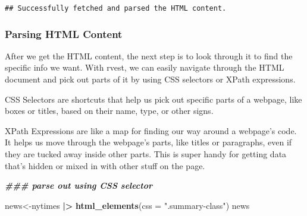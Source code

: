 \documentclass[
]{article}
\newenvironment{Shaded}{\begin{snugshade}}{\end{snugshade}}
\newcommand{\AttributeTok}[1]{\textcolor[rgb]{0.13,0.29,0.53}{#1}}
\newcommand{\DocumentationTok}[1]{\textcolor[rgb]{0.56,0.35,0.01}{\textbf{\textit{#1}}}}
\newcommand{\FunctionTok}[1]{\textcolor[rgb]{0.13,0.29,0.53}{\textbf{#1}}}
\newcommand{\NormalTok}[1]{#1}
\newcommand{\OtherTok}[1]{\textcolor[rgb]{0.56,0.35,0.01}{#1}}
\newcommand{\SpecialCharTok}[1]{\textcolor[rgb]{0.81,0.36,0.00}{\textbf{#1}}}
\newcommand{\StringTok}[1]{\textcolor[rgb]{0.31,0.60,0.02}{#1}}
\begin{document}
\begin{verbatim}
## Successfully fetched and parsed the HTML content.
\end{verbatim}

\hypertarget{parsing-html-content}{%
\subsubsection{Parsing HTML Content}\label{parsing-html-content}}

After we get the HTML content, the next step is to look through it to
find the specific info we want. With rvest, we can easily navigate
through the HTML document and pick out parts of it by using CSS
selectors or XPath expressions.

CSS Selectors are shortcuts that help us pick out specific parts of a
webpage, like boxes or titles, based on their name, type, or other
signs.

XPath Expressions are like a map for finding our way around a webpage's
code. It helps us move through the webpage's parts, like titles or
paragraphs, even if they are tucked away inside other parts. This is
super handy for getting data that's hidden or mixed in with other stuff
on the page.

\begin{Shaded}
\begin{Highlighting}[]
\DocumentationTok{\#\#\# parse out using CSS selector}

\NormalTok{news}\OtherTok{\textless{}{-}}\NormalTok{nytimes }\SpecialCharTok{|\textgreater{}}
  \FunctionTok{html\_elements}\NormalTok{(}\AttributeTok{css =} \StringTok{".summary{-}class"}\NormalTok{) }
\NormalTok{news}
\end{Highlighting}
\end{Shaded}
\end{document}
